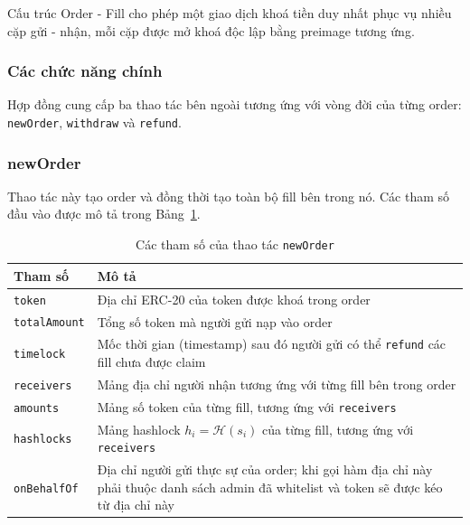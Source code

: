 Cấu trúc Order - Fill cho phép một giao dịch khoá tiền duy nhất phục vụ nhiều cặp gửi - nhận, mỗi cặp được mở khoá độc lập bằng preimage tương ứng.

\subsubsection{Các chức năng chính}

Hợp đồng cung cấp ba thao tác bên ngoài tương ứng với vòng đời của từng order: \texttt{newOrder}, \texttt{withdraw} và \texttt{refund}.

\subsubsection*{newOrder}

Thao tác này tạo order và đồng thời tạo toàn bộ fill bên trong nó.
Các tham số đầu vào được mô tả trong Bảng~\ref{tab:newOrder-params}.

\begin{table}[H]
    \centering
    \caption{Các tham số của thao tác \texttt{newOrder}}
    \label{tab:newOrder-params}
    \begin{tabular}{|l|p{10cm}|}
        \hline
        \textbf{Tham số} & \textbf{Mô tả} \\
        \hline
        \texttt{token} & Địa chỉ ERC-20 của token được khoá trong order \\
        \hline
        \texttt{totalAmount} & Tổng số token mà người gửi nạp vào order \\
        \hline
        \texttt{timelock} & Mốc thời gian (timestamp) sau đó người gửi có thể \texttt{refund} các fill chưa được claim \\
        \hline
        \texttt{receivers} & Mảng địa chỉ người nhận tương ứng với từng fill bên trong order \\
        \hline
        \texttt{amounts} & Mảng số token của từng fill, tương ứng với \texttt{receivers} \\
        \hline
        \texttt{hashlocks} & Mảng hashlock $h_i = \mathcal{H}(s_i)$ của từng fill, tương ứng với \texttt{receivers} \\
        \hline
        \texttt{onBehalfOf} & Địa chỉ người gửi thực sự của order; khi gọi hàm địa chỉ này phải thuộc danh sách admin đã whitelist và token sẽ được kéo từ địa chỉ này \\
        \hline
    \end{tabular}
\end{table}

